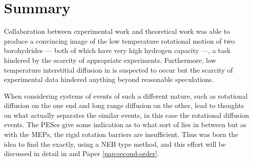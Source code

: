 \section{Summary}
\label{sec:borohydrides-summary}

Collaboration between experimental work and theoretical work was able to produce a convincing image of the low temperature rotational motion of two borohydrides --- both of which have very high hydrogen capacity ---, a task hindered by the scarcity of appropriate experiments.
Furthermore, low temperature  interstitial diffusion in  is suspected to occur but the scarcity of experimental data hindered anything beyond reasonable speculations.

When considering systems of events of such a different nature, such as rotational diffusion on the one end and long range diffusion on the other, lead to thoughts on what actually separates the similar events, in this case the rotational diffusion events.
The PESes give some indication as to what sort of  lies in between but as with the MEPs, the rigid rotation barriers are insufficient.
Thus was born the idea to find the  exactly, using a NEB type method, and this effort will be discussed in detail in  and Paper \ref{pap:second-order}.

